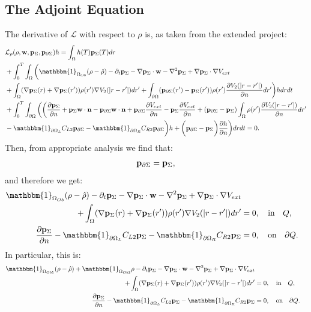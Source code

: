 \subsection*{The Adjoint Equation}
The derivative of $\mathcal{L}$ with respect to $\rho$ is, as taken from the extended project:
\begin{align*}
&\mathcal{L}_\rho (\rho,\mathbf{w},\Adja,\Adjc)h=
\int_\Omega h(T) \Adja(T) dr\\
&+ \int_0^T \int_\Omega \bigg( \mathbbm{1}_{ \Omega_{Ob}} (\rho- \hat{\rho})  - \partial_t \Adja  - \nabla \Adja \cdot \mathbf{w}  - \nabla^2 \Adja \notag 
+  \nabla \Adja \cdot \nabla V_{ext}  \notag \\
&+ \int_\Omega (\nabla  \Adja(r)+\nabla  \Adja(r')) \rho(r') \nabla V_2(|r-r'|) dr'+ \int_{\partial \Omega} ( \Adjc(r') - \Adja(r')) \rho(r')   \frac{\partial V_2(|r-r'|)}{\partial n} dr' \bigg) h dr dt \\
&+  \int_0^T\int_{\partial \Omega}  \bigg(
\bigg(\frac{\partial \Adja }{\partial n} + \Adja  \mathbf{w} \cdot \mathbf{n} - \Adjc \mathbf{w} \cdot \mathbf{n}  +  \Adjc \dfrac{\partial V_{ext}}{\partial n} - \Adja \frac{\partial V_{ext}}{\partial n} + ( \Adjc - \Adja)  \int_\Omega \rho(r') \frac{\partial V_2(|r-r'|)}{\partial n} dr'\\
& -\mathbbm{1}_{\partial \Omega_L} C_{L2} \Adjc   -\mathbbm{1}_{\partial \Omega_R} C_{R2} \Adjc \bigg)h + \bigg( \Adjc- \Adja \bigg) \frac{\partial h}{\partial n} \bigg) dr dt =0.
\end{align*}
Then, from appropriate analysis we find that:
\begin{align*}
\mathbf{p}_{\partial \Sigma} = \mathbf{p}_\Sigma,
\end{align*}
and therefore we get:
\begin{align*}
\mathbbm{1}_{\Omega_{Ob}}(\rho- \hat{\rho})   - \partial_t  \Adja  - \nabla \Adja \cdot \mathbf{w}  - \nabla^2 \Adja \notag 
+  \nabla \Adja \cdot \nabla V_{ext}  \notag \\
+ \int_\Omega (\nabla  \Adja(r)+\nabla  \Adja(r')) \rho(r') \nabla V_2(|r-r'|) dr' &=0, \quad \text{in} \quad Q, \\
\frac{\partial \Adja }{\partial n}  -\mathbbm{1}_{\partial \Omega_L} C_{L2} \Adja   -\mathbbm{1}_{\partial \Omega_R} C_{R2} \Adja&=0, \quad \text{on} \quad \partial Q.
\end{align*}
In particular, this is:
\begin{align*}
\mathbbm{1}_{\Omega_{Ob1}}(\rho- \hat{\rho}) +\mathbbm{1}_{\Omega_{Ob2}}\rho  - \partial_t  \Adja  - \nabla \Adja \cdot \mathbf{w}  - \nabla^2 \Adja \notag 
+  \nabla \Adja \cdot \nabla V_{ext}  \notag \\
+ \int_\Omega (\nabla  \Adja(r)+\nabla  \Adja(r')) \rho(r') \nabla V_2(|r-r'|) dr' &=0, \quad \text{in} \quad Q, \\
\frac{\partial \Adja }{\partial n}  -\mathbbm{1}_{\partial \Omega_L} C_{L2} \Adja   -\mathbbm{1}_{\partial \Omega_R} C_{R2} \Adja&=0, \quad \text{on} \quad \partial Q.
\end{align*}




